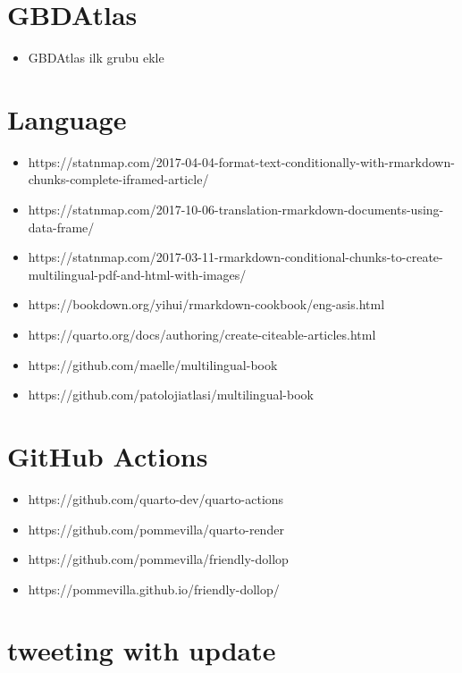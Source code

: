\documentclass[
  letterpaper,
  DIV=11,
  numbers=noendperiod]{scrreprt}
\providecommand{\tightlist}{%
  \setlength{\itemsep}{0pt}\setlength{\parskip}{0pt}}
\begin{document}
\hypertarget{gbdatlas}{%
\chapter{GBDAtlas}\label{gbdatlas}}

\begin{itemize}
\tightlist
\item
  GBDAtlas ilk grubu ekle
\end{itemize}

\hypertarget{language}{%
\chapter{Language}\label{language}}

\begin{itemize}
\tightlist
\item
  https://statnmap.com/2017-04-04-format-text-conditionally-with-rmarkdown-chunks-complete-iframed-article/
\item
  https://statnmap.com/2017-10-06-translation-rmarkdown-documents-using-data-frame/
\item
  https://statnmap.com/2017-03-11-rmarkdown-conditional-chunks-to-create-multilingual-pdf-and-html-with-images/
\item
  https://bookdown.org/yihui/rmarkdown-cookbook/eng-asis.html
\item
  https://quarto.org/docs/authoring/create-citeable-articles.html
\item
  https://github.com/maelle/multilingual-book
\item
  https://github.com/patolojiatlasi/multilingual-book
\end{itemize}

\hypertarget{github-actions}{%
\chapter{GitHub Actions}\label{github-actions}}

\begin{itemize}
\tightlist
\item
  https://github.com/quarto-dev/quarto-actions
\item
  https://github.com/pommevilla/quarto-render
\item
  https://github.com/pommevilla/friendly-dollop
\item
  https://pommevilla.github.io/friendly-dollop/
\end{itemize}

\hypertarget{tweeting-with-update}{%
\chapter{tweeting with update}\label{tweeting-with-update}}
\end{document}
